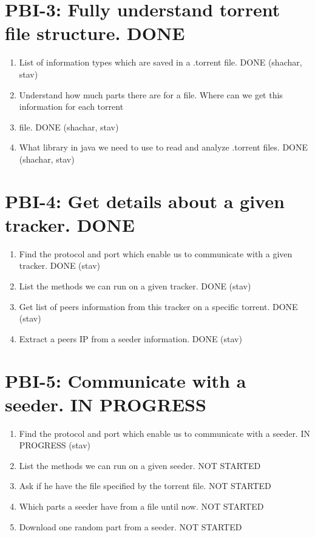 \documentclass[11pt]{article}
\begin{document}
\section{PBI-3: Fully understand torrent file structure. DONE}
\begin{enumerate}
\item List of information types which are saved in a .torrent file. \colorbox{gray!20}{DONE} (shachar, stav)
\item Understand how much parts there are for a file. Where can we get this information for each torrent \item file. \colorbox{gray!20}{DONE} (shachar, stav)
\item What library in java we need to use to read and analyze .torrent files. \colorbox{gray!20}{DONE} (shachar, stav)
\end{enumerate}

\section{PBI-4: Get details about a given tracker. DONE}
\begin{enumerate}
\item Find the protocol and port which enable us to communicate with a given tracker. \colorbox{gray!20}{DONE} (stav)
\item List the methods we can run on a given tracker. \colorbox{gray!20}{DONE} (stav)
\item Get list of peers information from this tracker on a specific torrent. \colorbox{gray!20}{DONE} (stav)
\item Extract a peers IP from a seeder information. \colorbox{gray!20}{DONE} (stav)
\end{enumerate}

\section{PBI-5: Communicate with a seeder. IN PROGRESS}
\begin{enumerate}
\item Find the protocol and port which enable us to communicate with a seeder. \colorbox{gray!20}{IN PROGRESS} (stav)
\item List the methods we can run on a given seeder. \colorbox{gray!20}{NOT STARTED}
\item Ask if he have the file specified by the torrent file. \colorbox{gray!20}{NOT STARTED}
\item Which parts a seeder have from a file until now. \colorbox{gray!20}{NOT STARTED}
\item Download one random part from a seeder. \colorbox{gray!20}{NOT STARTED}
\end{enumerate}
\end{document}
